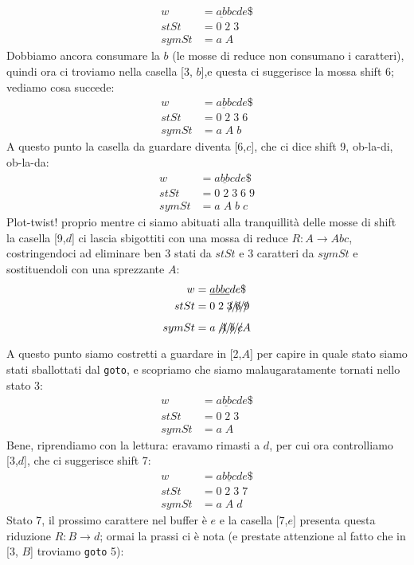 \documentclass[class=book, crop=false, oneside, 12pt]{standalone}
\begin{document}
\begin{align*}
    w &= \underline{ab}bcde\$ \\
    stSt &= 0\;2\;3\\
    symSt &= a\;A
\end{align*}
Dobbiamo ancora consumare la \(b\) (le mosse di reduce non consumano i caratteri), quindi ora ci troviamo nella casella [3, \(b\)],e questa ci suggerisce la mossa shift 6; vediamo cosa succede:
\begin{align*}
    w &= \underline{abb}cde\$ \\
    stSt &= 0\;2\;3\;6\\
    symSt &= a\;A\;b
\end{align*}
A questo punto la casella da guardare diventa [6,\(c\)], che ci dice shift 9, ob-la-di, ob-la-da:
\begin{align*}
    w &= \underline{abbc}de\$ \\
    stSt &= 0\;2\;3\;6\;9\\
    symSt &= a\;A\;b\;c
\end{align*}
Plot-twist! proprio mentre ci siamo abituati alla tranquillità delle mosse di shift la casella [9,\(d\)] ci lascia sbigottiti con una mossa di reduce \(R: A \to Abc\), costringendoci ad eliminare ben 3 stati da \(stSt\) e 3 caratteri da \(symSt\) e sostituendoli con una sprezzante \(A\):
\begin{align*}
    w &= \underline{abbc}de\$ \\
    stSt &= 0\;2\;\xout{3\;6\;9}\\
    symSt &= a\;\xout{A\;b\;c}A
\end{align*}
A questo punto siamo costretti a guardare in [2,\(A\)] per capire in quale stato siamo stati sballottati dal \texttt{goto}, e scopriamo che siamo malaugaratamente tornati nello stato 3:
\begin{align*}
    w &= \underline{abbc}de\$ \\
    stSt &= 0\;2\;3\\
    symSt &= a\;A
\end{align*}
Bene, riprendiamo con la lettura: eravamo rimasti a \(d\), per cui ora controlliamo [3,\(d\)], che ci suggerisce shift 7:
\begin{align*}
    w &= \underline{abbcd}e\$ \\
    stSt &= 0\;2\;3\;7\\
    symSt &= a\;A\;d
\end{align*}
Stato 7, il prossimo carattere nel buffer è \(e\) e la casella [7,\(e\)] presenta questa riduzione \(R: B\to d\); ormai la prassi ci è nota (e prestate attenzione al fatto che in [3, \(B\)] troviamo \texttt{goto} 5):
\end{document}

